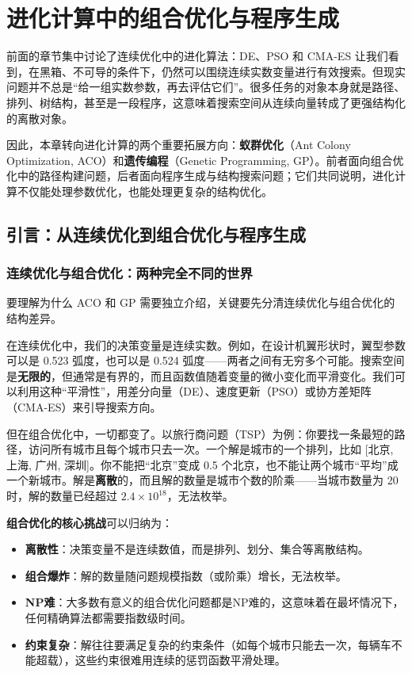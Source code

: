 \documentclass[lang=cn,zihao=-4,a4paper,fontset=windows]{beautybook}
\begin{document}
\chapter{进化计算中的组合优化与程序生成}

前面的章节集中讨论了连续优化中的进化算法：DE、PSO 和 CMA-ES 让我们看到，在黑箱、不可导的条件下，仍然可以围绕连续实数变量进行有效搜索。但现实问题并不总是“给一组实数参数，再去评估它们”。很多任务的对象本身就是路径、排列、树结构，甚至是一段程序，这意味着搜索空间从连续向量转成了更强结构化的离散对象。

因此，本章转向进化计算的两个重要拓展方向：\textbf{蚁群优化}（Ant Colony Optimization, ACO）和\textbf{遗传编程}（Genetic Programming, GP）。前者面向组合优化中的路径构建问题，后者面向程序生成与结构搜索问题；它们共同说明，进化计算不仅能处理参数优化，也能处理更复杂的结构优化。

\section{引言：从连续优化到组合优化与程序生成}

\subsection{连续优化与组合优化：两种完全不同的世界}

要理解为什么 ACO 和 GP 需要独立介绍，关键要先分清连续优化与组合优化的结构差异。

在连续优化中，我们的决策变量是连续实数。例如，在设计机翼形状时，翼型参数可以是 0.523 弧度，也可以是 0.524 弧度——两者之间有无穷多个可能。搜索空间是\textbf{无限的}，但通常是有界的，而且函数值随着变量的微小变化而平滑变化。我们可以利用这种“平滑性”，用差分向量（DE）、速度更新（PSO）或协方差矩阵（CMA-ES）来引导搜索方向。

但在组合优化中，一切都变了。以旅行商问题（TSP）为例：你要找一条最短的路径，访问所有城市且每个城市只去一次。一个解是城市的一个排列，比如 [北京, 上海, 广州, 深圳]。你不能把“北京”变成 0.5 个北京，也不能让两个城市“平均”成一个新城市。解是\textbf{离散}的，而且解的数量是城市个数的阶乘——当城市数量为 20 时，解的数量已经超过 $2.4\times10^{18}$，无法枚举。

\textbf{组合优化的核心挑战}可以归纳为：
\begin{itemize}
    \item \textbf{离散性}：决策变量不是连续数值，而是排列、划分、集合等离散结构。
    \item \textbf{组合爆炸}：解的数量随问题规模指数（或阶乘）增长，无法枚举。
    \item \textbf{NP难}：大多数有意义的组合优化问题都是NP难的，这意味着在最坏情况下，任何精确算法都需要指数级时间。
    \item \textbf{约束复杂}：解往往要满足复杂的约束条件（如每个城市只能去一次，每辆车不能超载），这些约束很难用连续的惩罚函数平滑处理。
\end{itemize}
\end{document}
